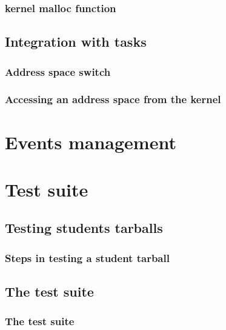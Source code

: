 
\begin{frame}
  \frametitle{kernel malloc function}
\end{frame}

%
%

\subsection{Integration with tasks}


\begin{frame}
  \frametitle{Address space switch}
\end{frame}


\begin{frame}
  \frametitle{Accessing an address space from the kernel}
\end{frame}

%
%

\section{Events management}

%
%

\section{Test suite}

%
%

\subsection{Testing students tarballs}


\begin{frame}
  \frametitle{Steps in testing a student tarball}
\end{frame}

%
%

\subsection{The test suite}


\begin{frame}
  \frametitle{The test suite}
\end{frame}


